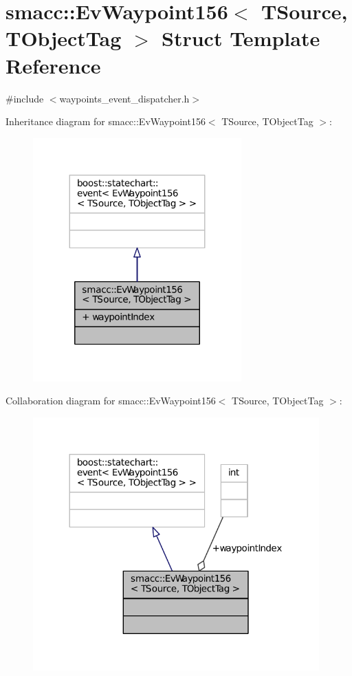 \hypertarget{structsmacc_1_1EvWaypoint156}{}\section{smacc\+:\+:Ev\+Waypoint156$<$ T\+Source, T\+Object\+Tag $>$ Struct Template Reference}
\label{structsmacc_1_1EvWaypoint156}


{\ttfamily \#include $<$waypoints\+\_\+event\+\_\+dispatcher.\+h$>$}



Inheritance diagram for smacc\+:\+:Ev\+Waypoint156$<$ T\+Source, T\+Object\+Tag $>$\+:
\nopagebreak
\begin{figure}[H]
\begin{center}
\leavevmode
\includegraphics[width=227pt]{structsmacc_1_1EvWaypoint156__inherit__graph}
\end{center}
\end{figure}


Collaboration diagram for smacc\+:\+:Ev\+Waypoint156$<$ T\+Source, T\+Object\+Tag $>$\+:
\nopagebreak
\begin{figure}[H]
\begin{center}
\leavevmode
\includegraphics[width=312pt]{structsmacc_1_1EvWaypoint156__coll__graph}
\end{center}
\end{figure}
